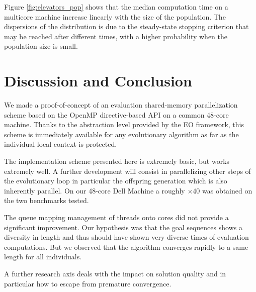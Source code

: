 \documentclass{sig-alternate}
\newcommand{\DAEYAHSP}{{\sc DaE$_{\text{YAHSP}}$}}
\begin{document}
Figure \ref{fig:elevators_pop} shows that the median computation time on a
multicore machine increase linearly with the size of the population. The 
dispersions of the distribution is due to the steady-state stopping criterion 
that may be reached after different times, with a higher probability when the
population size is small.

\section{Discussion and Conclusion}

We made a proof-of-concept of an evaluation shared-memory parallelization scheme based on the OpenMP directive-based API on a common 48-core machine.
Thanks to the abstraction level provided by the EO framework, this scheme is immediately available for any evolutionary algorithm as far as the individual local context is protected.

The implementation scheme presented here is extremely basic, but works extremely well.
A further development will consist in parallelizing other steps of the evolutionary loop in particular the offspring generation which is also inherently parallel.
On our 48-core Dell Machine a roughly $\times40$ was obtained on the two benchmarks tested.

The queue mapping management of threads onto cores did not provide a significant improvement. Our hypothesis was that the goal sequences shows a diversity in length and thus should have shown very diverse times of evaluation computations. But we observed that the algorithm converges rapidly to a same length for all individuals.


A further research axis deals with the impact on solution quality and in particular how to escape from premature convergence.








%

%
%
\end{document}
